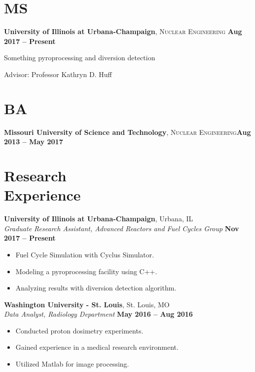 \documentclass[margin,line]{resume}
\begin{document}
\begin{resume}
    \section{\mysidestyle MS}
    \textbf{University of Illinois at Urbana-Champaign}, \textsc{Nuclear Engineering}\hfill \textbf{ Aug 2017 -- Present}\vspace{-3mm}\\\vspace{-1mm}%
    \begin{list2}
        \item Something pyroprocessing and diversion detection
        \item Advisor:  Professor Kathryn D. Huff
    \end{list2}\vspace{-1.5mm}
    \section{\mysidestyle BA}
    \textbf{Missouri University of Science and Technology}, \textsc{Nuclear Engineering}\hfill\textbf{Aug 2013 -- May 2017}\vspace{-3mm}\\\vspace{-1mm}%
    \section{\mysidestyle Research\\Experience}
    \textbf{University of Illinois at Urbana-Champaign}, Urbana, IL\\
		\textsl{Graduate Research Assistant, Advanced Reactors and Fuel Cycles Group} \hfill \textbf{Nov 2017 -- Present}\\
		\begin{itemize}
			\item Fuel Cycle Simulation with Cyclus Simulator.
			\item Modeling a pyroprocessing facility using C++.
			\item Analyzing results with diversion detection algorithm.
		\end{itemize}

    \textbf{Washington University - St. Louis}, St. Louis, MO\\
		\textsl{Data Analyst, Radiology Department} \hfill \textbf{May 2016 -- Aug 2016}\\
		\begin{itemize}
			\item Conducted proton dosimetry experiments.
			\item Gained experience in a medical research environment.
			\item Utilized Matlab for image processing.
		\end{itemize}

\end{resume}
\end{document}
